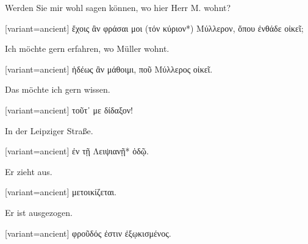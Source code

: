 Werden Sie mir wohl sagen können, wo hier Herr M. wohnt?

\switchcolumn

\begin{greek}[variant=ancient]%
ἔχοις ἂν φράσαι μοι (τόν κύριον{*}) Μύλλερον, ὅπου ἐνθάδε οἰκεῖ;

\end{greek}%
\switchcolumn*

Ich möchte gern erfahren, wo Müller wohnt.

\switchcolumn

\begin{greek}[variant=ancient]%
ἡδέως ἂν μάθοιμι, ποῦ Μύλλερος οἰκεῖ.

\end{greek}%
\switchcolumn*

Das möchte ich gern wissen.

\switchcolumn

\begin{greek}[variant=ancient]%
τοῦτ᾽ με δίδαξον!

\end{greek}%
\switchcolumn*

In der Leipziger Straße.

\switchcolumn

\begin{greek}[variant=ancient]%
ἐν τῇ Λειψιανῇ{*} ὁδῷ.

\end{greek}%
\switchcolumn*

Er zieht aus.

\switchcolumn

\begin{greek}[variant=ancient]%
μετοικίζεται.

\end{greek}%
\switchcolumn*

Er ist aus\textcompwordmark{}gezogen.

\switchcolumn

\begin{greek}[variant=ancient]%
φροῦδός ἐστιν ἐξῳκισμένος.

\end{greek}%
\switchcolumn*

